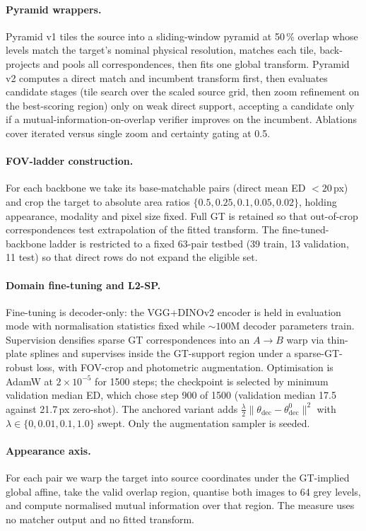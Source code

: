\documentclass[10pt]{article}
\begin{document}
\paragraph{Pyramid wrappers.} Pyramid v1 tiles the source into a sliding-window pyramid at 50\,\% overlap whose levels match the target's nominal physical resolution, matches each tile, back-projects and pools all correspondences, then fits one global transform. Pyramid v2 computes a direct match and incumbent transform first, then evaluates candidate stages (tile search over the scaled source grid, then zoom refinement on the best-scoring region) only on weak direct support, accepting a candidate only if a mutual-information-on-overlap verifier improves on the incumbent. Ablations cover iterated versus single zoom and certainty gating at 0.5.

\paragraph{FOV-ladder construction.} For each backbone we take its base-matchable pairs (direct mean ED ${<}20$\,px) and crop the target to absolute area ratios $\{0.5,0.25,0.1,0.05,0.02\}$, holding appearance, modality and pixel size fixed. Full GT is retained so that out-of-crop correspondences test extrapolation of the fitted transform. The fine-tuned-backbone ladder is restricted to a fixed 63-pair testbed (39 train, 13 validation, 11 test) so that direct rows do not expand the eligible set.

\paragraph{Domain fine-tuning and L2-SP.} Fine-tuning is decoder-only: the VGG+DINOv2 encoder is held in evaluation mode with normalisation statistics fixed while ${\sim}100$M decoder parameters train. Supervision densifies sparse GT correspondences into an $A\rightarrow B$ warp via thin-plate splines and supervises inside the GT-support region under a sparse-GT-robust loss, with FOV-crop and photometric augmentation. Optimisation is AdamW at $2\times10^{-5}$ for 1500 steps; the checkpoint is selected by minimum validation median ED, which chose step 900 of 1500 (validation median 17.5 against 21.7\,px zero-shot). The anchored variant adds $\tfrac{\lambda}{2}\lVert\theta_{\mathrm{dec}}-\theta_{\mathrm{dec}}^{0}\rVert^{2}$ with $\lambda\in\{0,0.01,0.1,1.0\}$ swept. Only the augmentation sampler is seeded.

\paragraph{Appearance axis.} For each pair we warp the target into source coordinates under the GT-implied global affine, take the valid overlap region, quantise both images to 64 grey levels, and compute normalised mutual information over that region. The measure uses no matcher output and no fitted transform.
\end{document}
